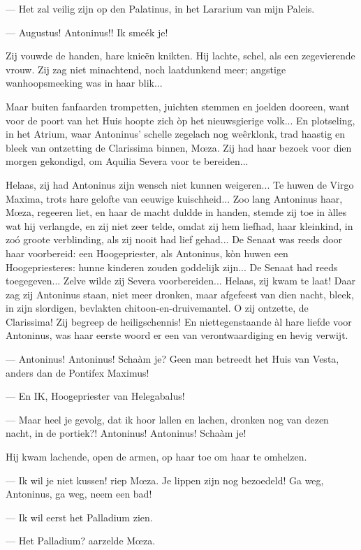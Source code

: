 \documentclass[a4paper, 12pt, oneside, dutch]{article}
\begin{document}
--- Het zal veilig zijn op den Palatinus, in het Lararium van mijn Paleis.

--- Augustus! Antoninus!! Ik smeék je!

Zij vouwde de handen, hare knieën knikten. Hij lachte, schel, als een zegevierende vrouw. Zij zag niet minachtend, noch laatdunkend meer; angstige wanhoopsmeeking was in haar blik...

Maar buiten fanfaarden trompetten, juichten stemmen en joelden dooreen, want voor de poort van het Huis hoopte zich òp het nieuwsgierige volk... En plotseling, in het Atrium, waar Antoninus' schelle zegelach nog weêrklonk, trad haastig en bleek van ontzetting de Clarissima binnen, Mœza. Zij had haar bezoek voor dien morgen gekondigd, om Aquilia Severa voor te bereiden...

Helaas, zij had Antoninus zijn wensch niet kunnen weigeren... Te huwen de Virgo Maxima, trots hare gelofte van eeuwige kuischheid... Zoo lang Antoninus haar, Mœza, regeeren liet, en haar de macht duldde in handen, stemde zij toe in àlles wat hij verlangde, en zij niet zeer telde, omdat zij hem liefhad, haar kleinkind, in zoó groote verblinding, als zij nooit had lief gehad... De Senaat was reeds door haar voorbereid: een Hoogepriester, als Antoninus, kòn huwen een Hoogepriesteres: hunne kinderen zouden goddelijk zijn... De Senaat had reeds toegegeven... Zelve wilde zij Severa voorbereiden... Helaas, zij kwam te laat! Daar zag zij Antoninus staan, niet meer dronken, maar afgefeest van dien nacht, bleek, in zijn slordigen, bevlakten chitoon-en-druivemantel. O zij ontzette, de Clarissima! Zij begreep de heiligschennis! En niettegenstaande àl hare liefde voor Antoninus, was haar eerste woord er een van verontwaardiging en hevig verwijt.

--- Antoninus! Antoninus! Schaàm je? Geen man betreedt het Huis van Vesta, anders dan de Pontifex Maximus!

--- En IK, Hoogepriester van Helegabalus!

--- Maar heel je gevolg, dat ik hoor lallen en lachen, dronken nog van dezen nacht, in de portiek?! Antoninus! Antoninus! Schaàm je!

Hij kwam lachende, open de armen, op haar toe om haar te omhelzen.

--- Ik wil je niet kussen! riep Mœza. Je lippen zijn nog bezoedeld! Ga weg, Antoninus, ga weg, neem een bad!

--- Ik wil eerst het Palladium zien.

--- Het Palladium? aarzelde Mœza.
\end{document}
